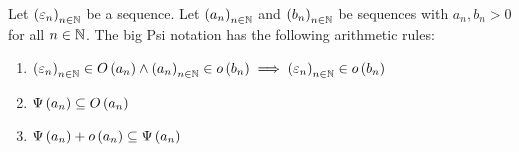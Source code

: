 \begin{theorem} \label{thm:bigpsi:rules}
  Let $\seq{\epsilon_n}$ be a sequence. Let $\seq{a_n}$ and $\seq{b_n}$ be sequences with $a_n,b_n > 0$ for all $n\in\N$. The big Psi notation has the following arithmetic rules:

  \begin{enumerate}
    \item $\seq{\epsilon_n} \in \bigo{a_n} \land \seq{a_n} \in \littleo{b_n} \implies \seq{\epsilon_n} \in \littleo{b_n}$
    \item $\bigpsi{a_n} \subseteq \bigo{a_n}$
    \item $\bigpsi{a_n} + \littleo{a_n} \subseteq \bigpsi{a_n}$
  \end{enumerate}
\end{theorem}

